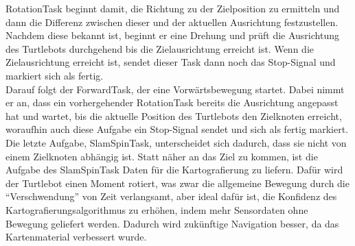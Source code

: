 RotationTask beginnt damit, die Richtung zu der Zielposition zu ermitteln und dann die Differenz zwischen dieser und der
aktuellen Ausrichtung festzustellen.
Nachdem diese bekannt ist, beginnt er eine Drehung und prüft die Ausrichtung des Turtlebots durchgehend bis die
Zielausrichtung erreicht ist.
Wenn die Zielausrichtung erreicht ist, sendet dieser Task dann noch das Stop-Signal und markiert sich als fertig.\\

Darauf folgt der ForwardTask, der eine Vorwärtsbewegung startet.
Dabei nimmt er an, dass ein vorhergehender RotationTask bereits die Ausrichtung angepasst hat und wartet, bis die
aktuelle Position des Turtlebots den Zielknoten erreicht, woraufhin auch diese Aufgabe ein Stop-Signal sendet und sich
als fertig markiert.\\

Die letzte Aufgabe, SlamSpinTask, unterscheidet sich dadurch, dass sie nicht von einem Zielknoten abhängig ist.
Statt näher an das Ziel zu kommen, ist die Aufgabe des SlamSpinTask Daten für die Kartografierung zu liefern.
Dafür wird der Turtlebot einen Moment rotiert, was zwar die allgemeine Bewegung durch die ``Verschwendung'' von Zeit
verlangsamt, aber ideal dafür ist, die Konfidenz des Kartografierungsalgorithmus zu erhöhen, indem mehr Sensordaten ohne
Bewegung geliefert werden.
Dadurch wird zukünftige Navigation besser, da das Kartenmaterial verbessert wurde.

